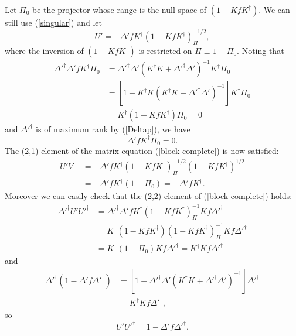 \documentclass[a4paper,a4paper]{article}
\begin{document}
Let $\Pi_0$ be the projector whose range is the null-space of
$(1-KfK^\dag)$. We can still use (\ref{singular}) and let
\begin{equation}
\label{Upp} U'=-\Delta'f K^\dag(1-K f K^\dag)^{-1/2}_\Pi,
\end{equation}
where the inversion of $(1-KfK^\dag)$ is restricted on $\Pi\equiv
1-\Pi_0$. Noting that
\begin{equation}
\begin{array}{rl}
\Delta'^\dag\Delta'fK^\dag\Pi_0&=\Delta'^\dag\Delta'(K^\dag
K+\Delta'^\dag\Delta')^{-1}K^\dag\Pi_0\\
&=[1-K^\dag K(K^\dag K+\Delta'^\dag\Delta')^{-1}]K^\dag\Pi_0\\
&=K^\dag(1-K f K^\dag)\Pi_0=0
\end{array}
\end{equation}
and  $\Delta'^\dag$ is of maximum rank by (\ref{Deltap}), we have
\begin{equation}\label{zero}
\Delta'fK^\dag\Pi_0=0.
\end{equation}
The (2,1) element of the matrix equation (\ref{block complete}) is
now satisfied:
\begin{equation}
\begin{array}{rl}
U'V^\dag&=-\Delta'f K^\dag(1-K f K^\dag)^{-1/2}_\Pi(1-K f
K^\dag)^{1/2}\\
&=-\Delta'f K^\dag(1-\Pi_0)=-\Delta'f K^\dag.
\end{array}
\end{equation}
Moreover we can easily check that the (2,2) element of (\ref{block
complete}) holds:
\begin{equation}\label{bc22l}\begin{array}{rl}
\Delta'^\dag U'U'^\dag&=\Delta'^\dag\Delta'fK^\dag(1-K
fK^\dag)^{-1}_\Pi Kf\Delta'^\dag\\
&=K^\dag(1-K f K^\dag)(1-K fK^\dag)^{-1}_\Pi Kf\Delta'^\dag\\
&=K^\dag(1-\Pi_0)Kf\Delta'^\dag=K^\dag Kf\Delta'^\dag
\end{array}\end{equation}
and
\begin{equation}\label{bc22r}\begin{array}{rl}
\Delta'^\dag(1-\Delta'f\Delta'^\dag)&=[1-\Delta'^\dag\Delta'
(K^\dag K+\Delta'^\dag\Delta')^{-1}]\Delta'^\dag\\
&=K^\dag Kf\Delta'^\dag,
\end{array}\end{equation}
so
\begin{equation}\label{bc22}
U'U'^\dag=1-\Delta'f\Delta'^\dag.
\end{equation}
\end{document}
